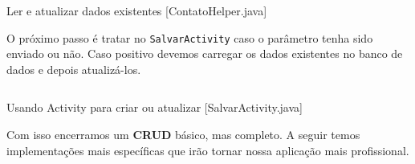 \begin{listing}[H]
  \inputminted[linenos=true,frame=bottomline,tabsize=3]{ java }{ source/ContatoHelper-4.java }
  \caption{Ler e atualizar dados existentes [ContatoHelper.java]}
\end{listing}

O próximo passo é tratar no \texttt{SalvarActivity} caso o parâmetro tenha sido enviado ou não. Caso positivo
devemos carregar os dados existentes no banco de dados e depois atualizá-los.

\begin{listing}[H]
  \inputminted[linenos=true,frame=bottomline,tabsize=3]{ java }{ source/SalvarActivity-3.java }
  \caption{Usando Activity para criar ou atualizar [SalvarActivity.java]}
\end{listing}

Com isso encerramos um \textbf{CRUD} básico, mas completo. A seguir temos implementações mais específicas
que irão tornar nossa aplicação mais profissional.